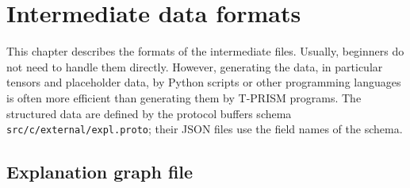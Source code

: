 \documentclass[a4paper]{report}
\begin{document}
\chapter{Intermediate data formats}
\label{chap:intermediate_data}

This chapter describes the formats of the intermediate files.  Usually,
beginners do not need to handle them directly.  However, generating the
data, in particular tensors and placeholder data, by Python scripts or other
programming languages is often more efficient than generating them by
T-PRISM programs.  The structured data are defined by the protocol buffers
schema {\tt src/c/external/expl.proto}; their JSON files use the field names
of the schema.

\section{Explanation graph file}
\label{sec:expl_file}
\end{document}
